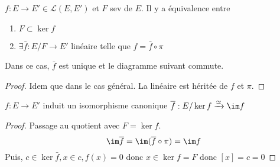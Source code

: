 \begin{thm}
    $f:E \longrightarrow E' \in  \mathcal  L(E, E')$ et $F$ sev de $E$. Il y a équivalence entre \begin{enumerate}
        \item $F\subset \ker f$
        \item  $ \exists \bar f: E / F \longrightarrow E'$ linéaire telle que $f=\bar f\circ \pi$
    \end{enumerate}
    Dans ce cas, $\bar f$ est unique et le diagramme suivant commute.
\begin{center}
\end{center}
\end{thm}

\begin{proof}
Idem que dans le cas général. La linéaire est héritée de $f$ et  $\pi$.
\end{proof}

\begin{thm}
    $f:E \longrightarrow E'$ induit un isomorphisme canonique  $\bar f: E / \ker f \xrightarrow{\simeq} \im f$
\end{thm}

\begin{proof}
Passage au quotient avec $F=\ker f$.  \[
    \im \bar f=\im(\bar f\circ \pi)=\im f
\]
Puis, $c \in  \ker \bar f, x \in  c, f(x)=0$ donc $x \in  \ker f=F$ donc $[x]=c=0$
\end{proof}
